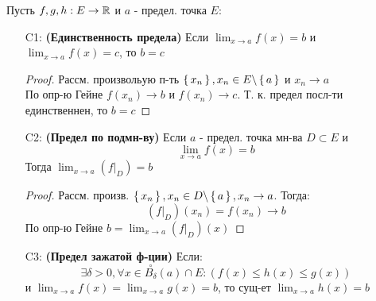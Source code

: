 Пусть $f, g, h: E \rightarrow \mathbb{R}$ и $a$ - предел. точка $E$:
\begin{itemize}
  \item [C1: ] \textbf{(Единственность предела)} Если $\lim_{x\to a} f(x) = b$ и $\lim_{x\to a} f(x) = c$, то $b = c$
    \begin{proof}
    Рассм. произвольую п-ть $\set{x_n}, x_n \in E \backslash \set{a}$ и $x_n \rightarrow a$ \\ 

    По опр-ю Гейне $f(x_n) \rightarrow b$ и $f(x_n) \rightarrow c$. Т. к. предел посл-ти единственнен, то $b = c$
    \end{proof} 
  \item [C2: ] \textbf{(Предел по подмн-ву)} Если $a$ - предел. точка мн-ва $D \subset E$ и
    \[
      \lim_{x\to a} f(x) = b
    \]
    Тогда $\lim_{x\to a} (f|_{D}) = b$
    \begin{proof}
    Рассм. произв. $\set{x_n}, x_n \in D \backslash \set{a}, x_n \rightarrow a$. Тогда:
    \[
      (f|_{D})(x_n) = f(x_n) \rightarrow b
    \]
    По опр-ю Гейне $ b = \lim_{x\to a}(f|_D)(x)$
    \end{proof}
  \item [C3: ] \textbf{(Предел зажатой ф-ции)} Если:
    \[
      \exists \delta > 0, \forall x \in \overset{\circ}{B_{\delta}}(a) \cap E \colon (f(x) \leq h(x) \leq g(x))
    \]
    и $\lim_{x\to a}f(x) = \lim_{x\to a} g(x) = b$, то сущ-ет $\lim_{x\to a} h(x) = b$


\end{itemize}
